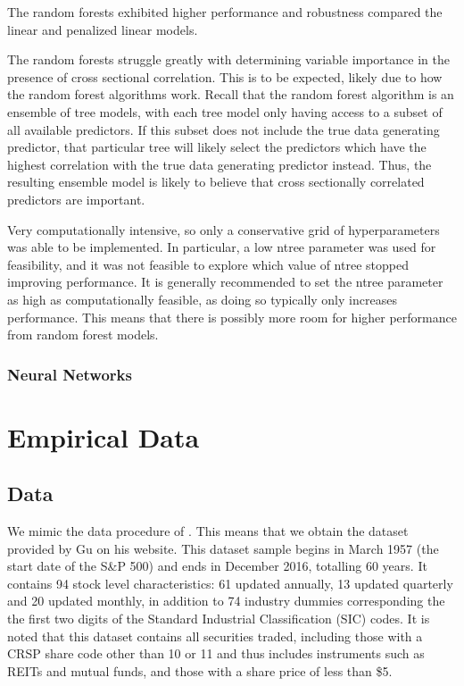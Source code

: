 \documentclass[a4paper, table]{article}
\begin{document}
The random forests exhibited higher performance and robustness compared the linear and penalized linear models.

The random forests struggle greatly with determining variable importance in the presence of cross sectional correlation. This is to be expected, likely due to how the random forest algorithms work. Recall that the random forest algorithm is an ensemble of tree models, with each tree model only having access to a subset of all available predictors. If this subset does not include the true data generating predictor, that particular tree will likely select the predictors which have the highest correlation with the true data generating predictor instead. Thus, the resulting ensemble model is likely to believe that cross sectionally correlated predictors are important.

Very computationally intensive, so only a conservative grid of hyperparameters was able to be implemented. In particular, a low ntree parameter was used for feasibility, and it was not feasible to explore which value of ntree stopped improving performance. It is generally recommended to set the ntree parameter as high as computationally feasible, as doing so typically only increases performance. This means that there is possibly more room for higher performance from random forest models.

\subsubsection{Neural Networks}



\section{Empirical Data}

\subsection{Data}

We mimic the data procedure of \cite{gu_empirical_2018}. This means that we obtain the dataset provided by Gu on his website. This dataset sample begins in March 1957 (the start date of the S\&P 500) and ends in December 2016, totalling 60 years. It contains 94 stock level characteristics: 61 updated annually, 13 updated quarterly and 20 updated monthly, in addition to 74 industry dummies corresponding the the first two digits of the Standard Industrial Classification (SIC) codes. It is noted that this dataset contains all securities traded, including those with a CRSP share code other than 10 or 11 and thus includes instruments such as REITs and mutual funds, and those with a share price of less than \$5.
\end{document}
